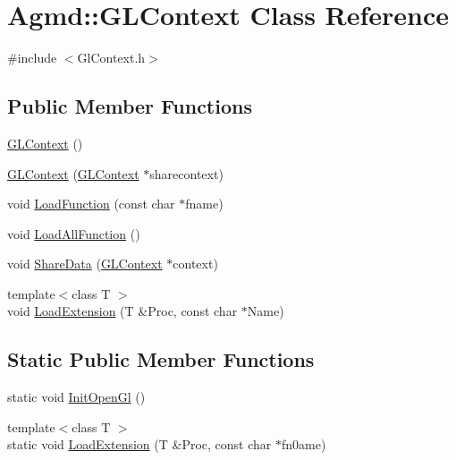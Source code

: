 \hypertarget{class_agmd_1_1_g_l_context}{\section{Agmd\+:\+:G\+L\+Context Class Reference}
\label{class_agmd_1_1_g_l_context}
}


{\ttfamily \#include $<$Gl\+Context.\+h$>$}

\subsection*{Public Member Functions}
\begin{DoxyCompactItemize}
\item 
\hyperlink{class_agmd_1_1_g_l_context_a759b2221891afa74a41ae54d21a5dccb}{G\+L\+Context} ()
\item 
\hyperlink{class_agmd_1_1_g_l_context_ac4e90af5d67b2a29064655f961a7db97}{G\+L\+Context} (\hyperlink{class_agmd_1_1_g_l_context}{G\+L\+Context} $\ast$sharecontext)
\item 
void \hyperlink{class_agmd_1_1_g_l_context_a19a535c7e3bc426d85f573afd2e5ed64}{Load\+Function} (const char $\ast$fname)
\item 
void \hyperlink{class_agmd_1_1_g_l_context_a103ae1a210b9e5100884e212953e4964}{Load\+All\+Function} ()
\item 
void \hyperlink{class_agmd_1_1_g_l_context_a6d47005ef1b6435851ff205b171b3b6e}{Share\+Data} (\hyperlink{class_agmd_1_1_g_l_context}{G\+L\+Context} $\ast$context)
\item 
{\footnotesize template$<$class T $>$ }\\void \hyperlink{class_agmd_1_1_g_l_context_a3c9eb21021cc80f535bff3ac19050147}{Load\+Extension} (T \&Proc, const char $\ast$Name)
\end{DoxyCompactItemize}
\subsection*{Static Public Member Functions}
\begin{DoxyCompactItemize}
\item 
static void \hyperlink{class_agmd_1_1_g_l_context_a8a2feaf790ed87422b2322568fddbc47}{Init\+Open\+Gl} ()
\item 
{\footnotesize template$<$class T $>$ }\\static void \hyperlink{class_agmd_1_1_g_l_context_aa19494fd5f7ac28cb29b09083085c478}{Load\+Extension} (T \&Proc, const char $\ast$fn0ame)
\end{DoxyCompactItemize}
